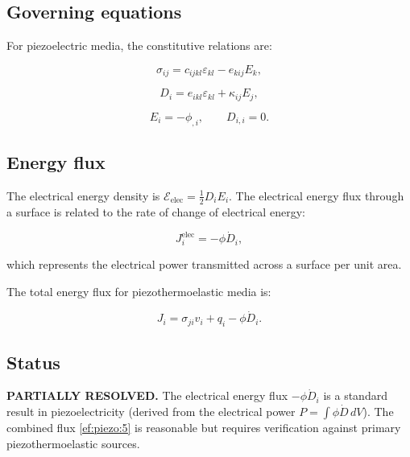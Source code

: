 \subsection{Governing equations}

For piezoelectric media, the constitutive relations are:

\begin{equation}
\sigma_{ij} = c_{ijkl}\varepsilon_{kl} - e_{kij}E_k,
\label{ef:piezo:1}
\end{equation}

\begin{equation}
D_i = e_{ikl}\varepsilon_{kl} + \kappa_{ij}E_j,
\label{ef:piezo:2}
\end{equation}

\begin{equation}
E_i = -\phi_{,i}, \qquad D_{i,i} = 0.
\label{ef:piezo:3}
\end{equation}

\subsection{Energy flux}

The electrical energy density is $\mathcal{E}_{\text{elec}} = \frac{1}{2}D_iE_i$. The electrical energy flux through a surface is related to the rate of change of electrical energy:

\begin{equation}
J_i^{\text{elec}} = -\phi \dot{D}_i,
\label{ef:piezo:4}
\end{equation}

which represents the electrical power transmitted across a surface per unit area.

The total energy flux for piezothermoelastic media is:

\begin{equation}
J_i = \sigma_{ji}v_i + q_i - \phi\dot{D}_i.
\label{ef:piezo:5}
\end{equation}

\subsection{Status}

\textbf{PARTIALLY RESOLVED.} The electrical energy flux $-\phi\dot{D}_i$ is a standard result in piezoelectricity (derived from the electrical power $P = \int \phi\dot{D} \, dV$). The combined flux \eqref{ef:piezo:5} is reasonable but requires verification against primary piezothermoelastic sources.

